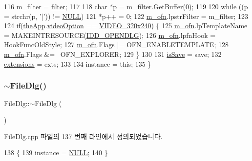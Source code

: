 \begin{DoxyCode}
116   m\_filter = \mbox{\hyperlink{_s_d_l_8cpp_af0122ee4312107103b580a98c74a4ea6}{filter}};
117   
118   \textcolor{keywordtype}{char} *p = m\_filter.GetBuffer(0);
119   
120   \textcolor{keywordflow}{while} ((p = strchr(p, \textcolor{charliteral}{'|'})) != \mbox{\hyperlink{getopt1_8c_a070d2ce7b6bb7e5c05602aa8c308d0c4}{NULL}})
121     *p++ = 0;
122   \mbox{\hyperlink{class_file_dlg_a3ee514d5dca456bd90c598af5412269a}{m\_ofn}}.lpstrFilter = m\_filter;
123 
124   \textcolor{keywordflow}{if}(\mbox{\hyperlink{_v_b_a_8cpp_a8095a9d06b37a7efe3723f3218ad8fb3}{theApp}}.\mbox{\hyperlink{class_v_b_a_a17dac073149c897f770c00ed7098ad32}{videoOption}} == \mbox{\hyperlink{_v_b_a_8h_a531c35e38ede3ea4e5ba5afb24b29493a658665cfbdbd908bdb77babe125d0341}{VIDEO\_320x240}}) \{
125     \mbox{\hyperlink{class_file_dlg_a3ee514d5dca456bd90c598af5412269a}{m\_ofn}}.lpTemplateName = MAKEINTRESOURCE(\mbox{\hyperlink{resource_8h_aca688c219ac7ed13616c1ac7ebcf7e68}{IDD\_OPENDLG}});
126     \mbox{\hyperlink{class_file_dlg_a3ee514d5dca456bd90c598af5412269a}{m\_ofn}}.lpfnHook = HookFuncOldStyle;
127     \mbox{\hyperlink{class_file_dlg_a3ee514d5dca456bd90c598af5412269a}{m\_ofn}}.Flags |= OFN\_ENABLETEMPLATE;
128     \mbox{\hyperlink{class_file_dlg_a3ee514d5dca456bd90c598af5412269a}{m\_ofn}}.Flags &= ~OFN\_EXPLORER;
129   \}
130 
131   \mbox{\hyperlink{class_file_dlg_aea50dcea1e8ef52d9b61f9cd37a69c0f}{isSave}} = save;
132   \mbox{\hyperlink{class_file_dlg_a5ee21f6dd33189d20e302e994323d578}{extensions}} = exts;
133 
134   instance = \textcolor{keyword}{this};
135 \}
\end{DoxyCode}
\mbox{\label{class_file_dlg_a2c16975c30da7d9d32efe76c61082289}} 
\subsubsection{\texorpdfstring{$\sim$\+File\+Dlg()}{~FileDlg()}}
{\footnotesize\ttfamily File\+Dlg\+::$\sim$\+File\+Dlg (\begin{DoxyParamCaption}{ }\end{DoxyParamCaption})\hspace{0.3cm}{\ttfamily [virtual]}}



File\+Dlg.\+cpp 파일의 137 번째 라인에서 정의되었습니다.


\begin{DoxyCode}
138 \{
139   instance = \mbox{\hyperlink{getopt1_8c_a070d2ce7b6bb7e5c05602aa8c308d0c4}{NULL}};
140 \}
\end{DoxyCode}


